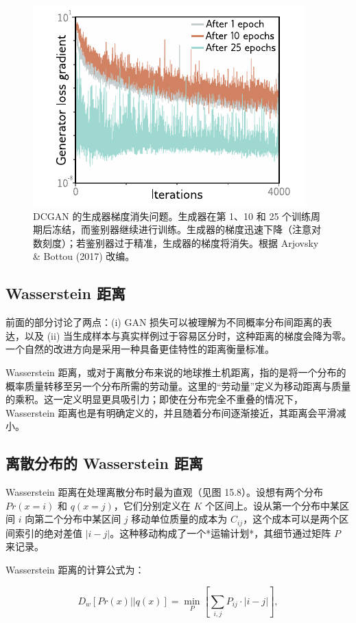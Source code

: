 \documentclass[lang=cn,newtx,10pt,scheme=chinese]{elegantbook}
\begin{document}
\begin{figure}[ht!]
\centering
\includegraphics[width=0.7\linewidth]{PDFFigures/UDLChap15PDF/GanGradients.pdf}
\caption{DCGAN 的生成器梯度消失问题。生成器在第 1、10 和 25 个训练周期后冻结，而鉴别器继续进行训练。生成器的梯度迅速下降（注意对数刻度）；若鉴别器过于精准，生成器的梯度将消失。根据 Arjovsky \& Bottou (2017) 改编。}
\end{figure}


\subsection{Wasserstein 距离}
前面的部分讨论了两点：(i) GAN 损失可以被理解为不同概率分布间距离的表达，以及 (ii) 当生成样本与真实样例过于容易区分时，这种距离的梯度会降为零。一个自然的改进方向是采用一种具备更佳特性的距离衡量标准。

Wasserstein 距离，或对于离散分布来说的地球推土机距离，指的是将一个分布的概率质量转移至另一个分布所需的劳动量。这里的“劳动量”定义为移动距离与质量的乘积。这一定义明显更具吸引力；即使在分布完全不重叠的情况下，Wasserstein 距离也是有明确定义的，并且随着分布间逐渐接近，其距离会平滑减小。

\subsection{离散分布的 Wasserstein 距离}
Wasserstein 距离在处理离散分布时最为直观（见图 15.8）。设想有两个分布 \(Pr(x = i)\) 和 \(q(x = j)\)，它们分别定义在 \(K\) 个区间上。设从第一个分布中某区间 \(i\) 向第二个分布中某区间 \(j\) 移动单位质量的成本为 \(C_{ij}\)，这个成本可以是两个区间索引的绝对差值 \(|i - j|\)。这种移动构成了一个*运输计划*，其细节通过矩阵 \(P\) 来记录。

Wasserstein 距离的计算公式为：

\begin{equation}
D_w [ Pr(x) || q(x) ] = \min_{P} \left[ \sum_{i,j} P_{ij} \cdot |i - j| \right], 
\end{equation}
\end{document}

